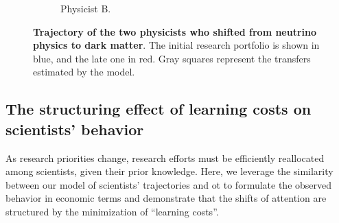 \documentclass{article}
\begin{document}
\begin{figure}[h]
\begin{subfigure}{0.45\textwidth}
    \caption{Physicist B. %
    }
    \label{fig:J.F.Beacom.1}
\end{subfigure}
\caption{\textbf{Trajectory of the two physicists who shifted from neutrino physics to dark matter}. The initial research portfolio is shown in blue, and the late one in red. Gray squares represent the transfers estimated by the model.}
\label{fig:turns_neutrinos_dm}
\end{figure}

\subsection{\label{sec:optimal-transport}The structuring effect of learning costs on scientists' behavior}

As research priorities change, research efforts must be efficiently reallocated among scientists, given their prior knowledge. Here, we leverage the similarity between our model of scientists' trajectories and \gls{ot} \citep{muzellec2017tsallis,li2019learning} to formulate the observed behavior in economic terms and demonstrate that the shifts of attention are structured by the minimization of ``learning costs''.
\end{document}
